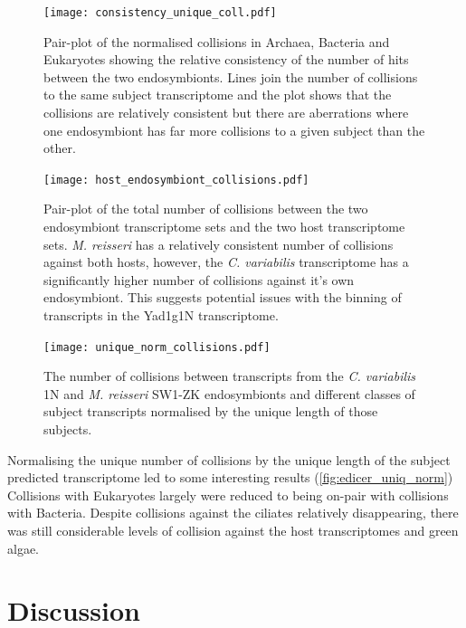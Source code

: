 \begin{figure}
    \centering
    \texttt{[image: consistency\_unique\_coll.pdf]}
    \caption[Pair-plot of Normalised Collisions in Both Endosymbiont]
    {Pair-plot of the normalised collisions in Archaea, Bacteria
    and Eukaryotes showing the relative consistency of the
number of hits between the two endosymbionts.  Lines join the number
of collisions to the same subject transcriptome and the plot
shows that the collisions are relatively consistent but there
are aberrations where one endosymbiont has far more collisions
to a given subject than the other.}
    \label{fig:consistency_most}
\end{figure}


\begin{figure}
    \centering
    \texttt{[image: host\_endosymbiont\_collisions.pdf]}
    \caption[Pair-plot of Collisions in Host-Endosymbiont pairs]
    {Pair-plot of the total number of collisions between
        the two endosymbiont transcriptome sets and 
        the two host transcriptome sets. \textit{M. reisseri}
        has a relatively consistent number of collisions
        against both hosts, however, the \textit{C. variabilis}
        transcriptome has a significantly higher number
        of collisions against it's own endosymbiont.
        This suggests potential issues with the binning
    of transcripts in the Yad1g1N transcriptome.}
    \label{fig:pairs_endo}
\end{figure}

\begin{figure}
    \centering
    \texttt{[image: unique\_norm\_collisions.pdf]}
    \caption[Normalised Unique eDicer Collisions]{The number of collisions
        between transcripts from the \textit{C. variabilis} 1N
    and \textit{M. reisseri} SW1-ZK endosymbionts and different
classes of subject transcripts normalised by the unique length of those
subjects.}
    \label{fig:edicer_unique_norm}
\end{figure}

Normalising the unique number of collisions by the unique length of
the subject predicted transcriptome led to some interesting results (\cref{fig:edicer_uniq_norm})
Collisions with Eukaryotes largely were reduced to being on-pair
with collisions with Bacteria. 
Despite collisions against the ciliates relatively disappearing,
there was still considerable levels of collision against
the host transcriptomes and green algae.

\section{Discussion}

